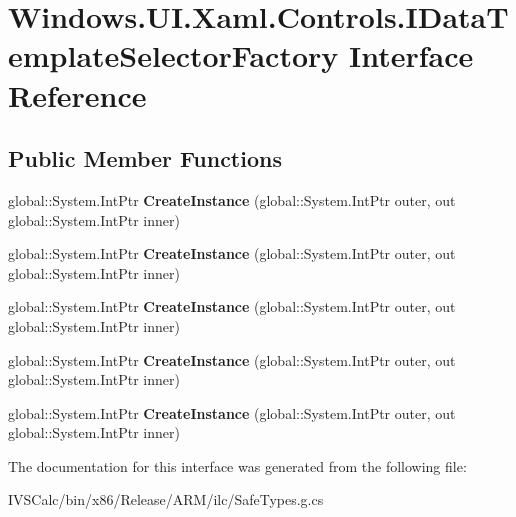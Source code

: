\hypertarget{interface_windows_1_1_u_i_1_1_xaml_1_1_controls_1_1_i_data_template_selector_factory}{}\section{Windows.\+U\+I.\+Xaml.\+Controls.\+I\+Data\+Template\+Selector\+Factory Interface Reference}
\label{interface_windows_1_1_u_i_1_1_xaml_1_1_controls_1_1_i_data_template_selector_factory}
\subsection*{Public Member Functions}
\begin{DoxyCompactItemize}
\item 
\mbox{\label{interface_windows_1_1_u_i_1_1_xaml_1_1_controls_1_1_i_data_template_selector_factory_a7f75571e7152fb4d47e7039bb69a6346}} 
global\+::\+System.\+Int\+Ptr {\bfseries Create\+Instance} (global\+::\+System.\+Int\+Ptr outer, out global\+::\+System.\+Int\+Ptr inner)
\item 
\mbox{\label{interface_windows_1_1_u_i_1_1_xaml_1_1_controls_1_1_i_data_template_selector_factory_a7f75571e7152fb4d47e7039bb69a6346}} 
global\+::\+System.\+Int\+Ptr {\bfseries Create\+Instance} (global\+::\+System.\+Int\+Ptr outer, out global\+::\+System.\+Int\+Ptr inner)
\item 
\mbox{\label{interface_windows_1_1_u_i_1_1_xaml_1_1_controls_1_1_i_data_template_selector_factory_a7f75571e7152fb4d47e7039bb69a6346}} 
global\+::\+System.\+Int\+Ptr {\bfseries Create\+Instance} (global\+::\+System.\+Int\+Ptr outer, out global\+::\+System.\+Int\+Ptr inner)
\item 
\mbox{\label{interface_windows_1_1_u_i_1_1_xaml_1_1_controls_1_1_i_data_template_selector_factory_a7f75571e7152fb4d47e7039bb69a6346}} 
global\+::\+System.\+Int\+Ptr {\bfseries Create\+Instance} (global\+::\+System.\+Int\+Ptr outer, out global\+::\+System.\+Int\+Ptr inner)
\item 
\mbox{\label{interface_windows_1_1_u_i_1_1_xaml_1_1_controls_1_1_i_data_template_selector_factory_a7f75571e7152fb4d47e7039bb69a6346}} 
global\+::\+System.\+Int\+Ptr {\bfseries Create\+Instance} (global\+::\+System.\+Int\+Ptr outer, out global\+::\+System.\+Int\+Ptr inner)
\end{DoxyCompactItemize}


The documentation for this interface was generated from the following file\+:\begin{DoxyCompactItemize}
\item 
I\+V\+S\+Calc/bin/x86/\+Release/\+A\+R\+M/ilc/Safe\+Types.\+g.\+cs\end{DoxyCompactItemize}
